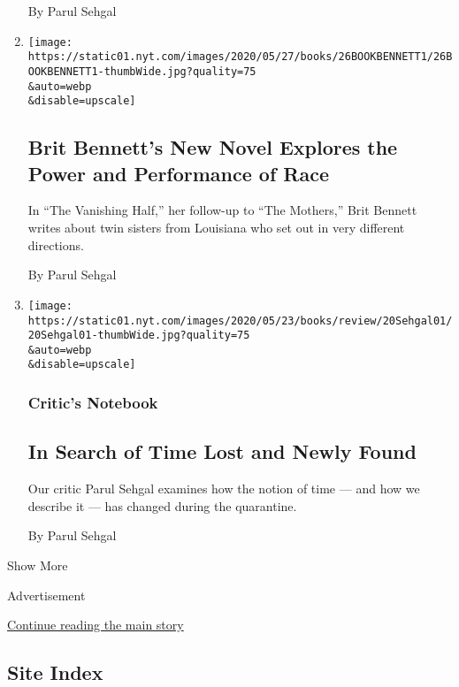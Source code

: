 \begin{enumerate}
  By Parul Sehgal
\item
  \href{/2020/05/26/books/review-vanishing-half-brit-bennett.html}{}

  \texttt{[image: https://static01.nyt.com/images/2020/05/27/books/26BOOKBENNETT1/26BOOKBENNETT1-thumbWide.jpg?quality=75\\\&auto=webp\\\&disable=upscale]}

  \hypertarget{brit-bennetts-new-novel-explores-the-power-and-performance-of-race}{%
  \subsection{Brit Bennett's New Novel Explores the Power and
  Performance of
  Race}\label{brit-bennetts-new-novel-explores-the-power-and-performance-of-race}}

  In ``The Vanishing Half,'' her follow-up to ``The Mothers,'' Brit
  Bennett writes about twin sisters from Louisiana who set out in very
  different directions.

  By Parul Sehgal
\item
  \href{/2020/05/19/books/review/coronavirus-literature-time.html}{}

  \texttt{[image: https://static01.nyt.com/images/2020/05/23/books/review/20Sehgal01/20Sehgal01-thumbWide.jpg?quality=75\\\&auto=webp\\\&disable=upscale]}

  \hypertarget{critics-notebook}{%
  \subsubsection{Critic's Notebook}\label{critics-notebook}}

  \hypertarget{in-search-of-time-lost-and-newly-found}{%
  \subsection{In Search of Time Lost and Newly
  Found}\label{in-search-of-time-lost-and-newly-found}}

  Our critic Parul Sehgal examines how the notion of time --- and how we
  describe it --- has changed during the quarantine.

  By Parul Sehgal
\end{enumerate}

Show More

Advertisement

\protect\hyperlink{after-mid2}{Continue reading the main story}

\hypertarget{site-index}{%
\subsection{Site Index}\label{site-index}}


